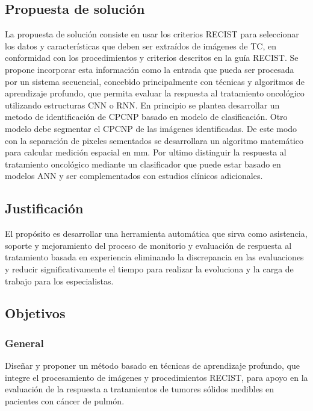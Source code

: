 \documentclass[11pt,a4paper,openany]{article}
\begin{document}
    \subsection{Propuesta de solución}
    La propuesta de solución consiste en usar los criterios RECIST para seleccionar los datos y características que deben ser extraídos de imágenes de TC, en conformidad con los procedimientos y criterios descritos en la guía RECIST. Se propone incorporar esta información como la entrada que pueda ser procesada por un sistema secuencial, concebido principalmente con técnicas y algoritmos de aprendizaje profundo, que permita evaluar la respuesta al tratamiento oncológico utilizando estructuras CNN o RNN. En principio se plantea desarrollar un metodo de identificación de CPCNP basado en modelo de clasificación. Otro modelo debe segmentar el CPCNP de las imágenes identificadas. De este modo con la separación de pixeles sementados se desarrollara un algoritmo matemático para calcular medición espacial en mm. Por ultimo distinguir la respuesta al tratamiento oncológico mediante un  clasificador que puede estar basado en modelos ANN y ser complementados con estudios clínicos adicionales. \\

    \subsection{Justificación}
    El propósito es desarrollar una herramienta automática que sirva como asistencia, soporte y mejoramiento del proceso de monitorio y evaluación de respuesta al tratamiento basada en experiencia eliminando la discrepancia en las evaluaciones y reducir significativamente el tiempo para realizar la evoluciona y la carga de trabajo para los especialistas.\\

    
    \subsection{Objetivos}
        \subsubsection{General}
        Diseñar y proponer un método basado en técnicas de aprendizaje profundo, que integre el procesamiento de imágenes y procedimientos RECIST, para apoyo en la evaluación de la respuesta a tratamientos de tumores sólidos medibles en pacientes con cáncer de pulmón.\\
\end{document}
